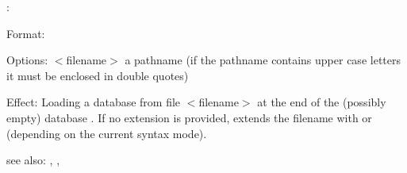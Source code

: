 \consult:

Format: 

Options: $<$filename$>$ a pathname (if the pathname contains upper case
         letters it must be enclosed in double quotes)

Effect: Loading a database from file $<$filename$>$ at the end of the
        (possibly empty) database . If no extension is
	provided, \RELFUN{} extends the filename with  or
         (depending on the current syntax mode).

see also: \destroy, \replace, \style
